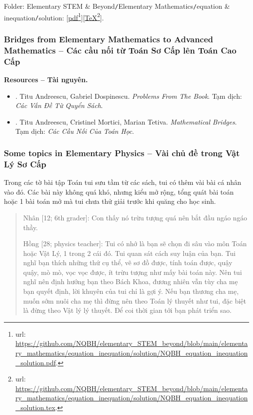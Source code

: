 \documentclass[12pt]{article}
\begin{document}
\begin{itemize}
\begin{itemize}
		Folder: {\sf Elementary STEM \& Beyond{\tt/}Elementary Mathematics{\tt/}equation \& inequation{\tt/}solution}: [\href{https://github.com/NQBH/elementary_STEM_beyond/blob/main/elementary_mathematics/equation_inequation/solution/NQBH_equation_inequation_solution.pdf}{pdf}\footnote{{\sc url}: \url{https://github.com/NQBH/elementary_STEM_beyond/blob/main/elementary_mathematics/equation_inequation/solution/NQBH_equation_inequation_solution.pdf}.}][\href{https://github.com/NQBH/elementary_STEM_beyond/blob/main/elementary_mathematics/equation_inequation/solution/NQBH_equation_inequation_solution.tex}{\TeX}\footnote{{\sc url}: \url{https://github.com/NQBH/elementary_STEM_beyond/blob/main/elementary_mathematics/equation_inequation/solution/NQBH_equation_inequation_solution.tex}.}].
	\end{itemize}
\end{itemize}

\subsubsection{Bridges from Elementary Mathematics to Advanced Mathematics -- Các cầu nối từ Toán Sơ Cấp lên Toán Cao Cấp}
\textbf{\textsf{Resources -- Tài nguyên.}}
\begin{itemize}
	\item \cite{Andreescu_Dospinescu2010}. {\sc Titu Andreescu, Gabriel Dospinescu}. {\it Problems From The Book}. Tạm dịch: {\it Các Vấn Đề Từ Quyển Sách}.
	\item \cite{Andreescu_Mortici_Tetiva2017}. {\sc Titu Andreescu, Cristinel Mortici, Marian Tetiva}. {\it Mathematical Bridges}. Tạm dịch: {\it Các Cầu Nối Của Toán Học}.
\end{itemize}


\subsubsection{Some topics in Elementary Physics -- Vài chủ đề trong Vật Lý Sơ Cấp}
Trong các tờ bài tập Toán tui sưu tầm từ các sách, tui có thêm vài bài cá nhân vào đó. Các bài này không quá khó, nhưng kiểu mở rộng, tổng quát bài toán hoặc 1 bài toán mở mà tui chưa thử giải trước khi quăng cho học sinh.

\begin{quotation}
	{\sf Nhân [12; 6th grader]}: Con thấy nó trừu tượng quá nên bắt đầu ngáo ngáo thầy.
	\vspace{2mm}
	
	{\sf Hồng [28; physics teacher]}: Tui có nhớ là bạn sẽ chọn đi sâu vào môn Toán hoặc Vật Lý, 1 trong 2 cái đó. Tui quan sát cách suy luận của bạn. Tui nghĩ bạn thích những thứ cụ thể, vẽ sơ đồ được, tính toán được, quậy quậy, mò mò, vọc vọc được, ít trừu tượng như mấy bài toán này. Nên tui nghĩ nên định hướng bạn theo Bách Khoa, đương nhiên vẫn tùy cha mẹ bạn quyết định, lời khuyên của tui chỉ là gợi ý. Nếu bạn thương cha mẹ, muốn sớm nuôi cha mẹ thì đừng nên theo Toán lý thuyết như tui, đặc biệt là đừng theo Vật lý lý thuyết. Để coi thời gian tới bạn phát triển sao.
\end{quotation}
\end{document}
